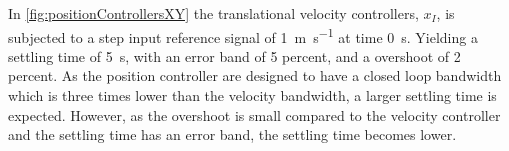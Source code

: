 \begin{minipage}{\linewidth}
\begin{minipage}{0.46\linewidth}
\begin{figure}[H]
            \centering
            \label{fig:velocityControllersXYAction}
        \end{figure}
    \end{minipage}
\end{minipage}

In \autoref{fig:positionControllersXY} the translational velocity controllers, $x_I$, is subjected to a step input reference signal of \SI{1}{m s^{-1}} at time \SI{0}{s}. Yielding a settling time of \SI{5}{s}, with an error band of 5 percent, and a overshoot of 2 percent. As the position controller are designed to have a closed loop bandwidth which is three times lower than the velocity bandwidth, a larger settling time is expected. However, as the overshoot is small compared to the velocity controller and the settling time has an error band, the settling time becomes lower.

